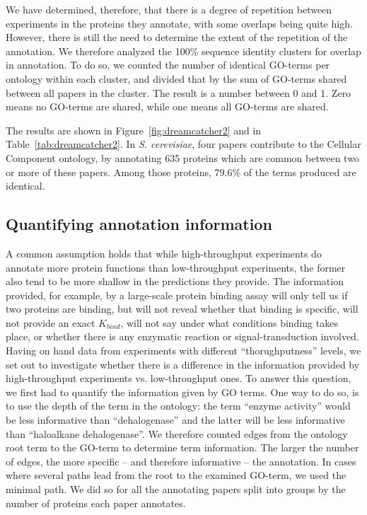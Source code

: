 \documentclass[12pt]{article}
\begin{document}
We have determined, therefore, that there is a degree of repetition between experiments in
the proteins they annotate, with some overlaps being quite high. However, there is still the
need to determine the extent of the repetition of the annotation. We therefore analyzed the
100\% sequence identity clusters for overlap in annotation.  To do so, we counted the number
of identical GO-terms per ontology within each cluster, and divided that by the sum of
GO-terms shared between all papers in the cluster. The result is a number between 0 and 1.
Zero means no GO-terms are shared, while one means all GO-terms are shared. 

The results are shown in Figure~\ref{fig:dreamcatcher2} and in
Table~\ref{tab:dreamcatcher2}. In \textit{S.  cerevisiae}, four papers contribute to the
Cellular Component ontology, by annotating 635 proteins which are common between two or more
of these papers. Among those proteins,  79.6\% of the terms produced are identical.

\subsection*{Quantifying annotation information}

A common assumption holds that while high-throughput experiments do annotate more protein
functions than low-throughput experiments, the former also tend to be more shallow in the
predictions they provide. The information provided, for example, by a large-scale protein
binding assay will only tell us if two proteins are binding, but will not reveal whether
that binding is specific, will not provide an exact $K_{bind}$, will not say under what
conditions binding takes place, or whether there is any enzymatic reaction or
signal-transduction involved. Having on hand data from experiments with different
``thorughputness'' levels,  we set out to investigate whether there is a difference in the
information provided by high-throughput experiments vs. low-throughput ones. To answer this
question, we first had to quantify the information given by GO terms. One way to do so, is
to use the depth of the term in the ontology: the term ``enzyme activity'' would be less
informative than ``dehalogenase'' and the latter will be less informative than ``haloalkane
dehalogenase''.  We therefore counted edges from the ontology root term to the GO-term to
determine term information. The larger the number of edges, the more specific -- and
therefore informative -- the annotation. In cases where several paths lead from the root to
the examined GO-term, we used the minimal path. We did so for all the annotating papers
split into groups by the number of proteins each paper annotates. 
\end{document}
